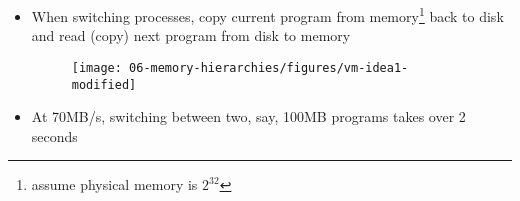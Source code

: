 








\begin{frame}[fragile]
\begin{itemize}
\item When switching processes, copy current program from memory\footnote{assume physical memory is $2^{32}$} back to disk and read (copy) next program from disk to memory
\begin{figure}[H]
\centering
	{\texttt{[image: 06-memory-hierarchies/figures/vm-idea1-modified]}}
\end{figure}
\item  At 70MB/s, switching between two, say, 100MB programs takes over 2 seconds
\end{itemize}
\end{frame}


